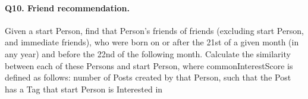 \paragraph{\textbf{Q10}. Friend recommendation.}
Given a start Person, find that Person's friends of friends (excluding
start Person, and immediate friends), who were born on or after the 21st
of a given month (in any year) and before the 22nd of the following
month. Calculate the similarity between each of these Persons and start
Person, where commonInterestScore is defined as follows: number of Posts
created by that Person, such that the Post has a Tag that start Person
is Interested in
